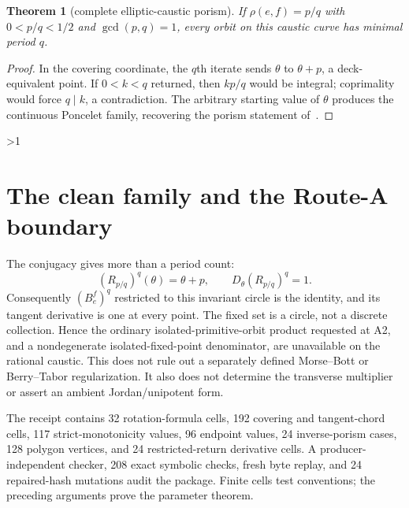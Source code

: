 \documentclass[10pt]{article}
\providecommand{\CRevisionRound}{2}
\newtheorem{theorem}{Theorem}
\begin{document}
\begin{theorem}[complete elliptic-caustic porism]
If $\rho(e,f)=p/q$ with $0<p/q<1/2$ and $\gcd(p,q)=1$, every orbit on
this caustic curve has minimal period $q$.
\end{theorem}
\begin{proof}
In the covering coordinate, the $q$th iterate sends
$\theta$ to $\theta+p$, a deck-equivalent point.  If $0<k<q$ returned,
then $kp/q$ would be integral; coprimality would force $q\mid k$, a
contradiction.  The arbitrary starting value of $\theta$ produces the
continuous Poncelet family, recovering the porism statement of~\cite{CF}.
\end{proof}
\fi

\ifnum\CRevisionRound>1
\section{The clean family and the Route-A boundary}
The conjugacy gives more than a period count:
\[
 (R_{p/q})^q(\theta)=\theta+p,\qquad
 D_\theta(R_{p/q})^q=1.
\]
Consequently $(B_e^f)^q$ restricted to this invariant circle is the identity,
and its tangent derivative is one at every point.  The fixed set is a circle,
not a discrete collection.  Hence the ordinary isolated-primitive-orbit
product requested at A2, and a nondegenerate isolated-fixed-point denominator,
are unavailable on the rational caustic.  This does not rule out a separately
defined Morse--Bott or Berry--Tabor regularization.  It also does not determine
the transverse multiplier or assert an ambient Jordan/unipotent form.

The receipt contains 32 rotation-formula cells, 192 covering and tangent-chord
cells, 117 strict-monotonicity values, 96 endpoint values, 24 inverse-porism
cases, 128 polygon vertices, and 24 restricted-return derivative cells.  A
producer-independent checker, 208 exact symbolic checks, fresh byte replay,
and 24 repaired-hash mutations audit the package.  Finite cells test
conventions; the preceding arguments prove the parameter theorem.
\end{document}
